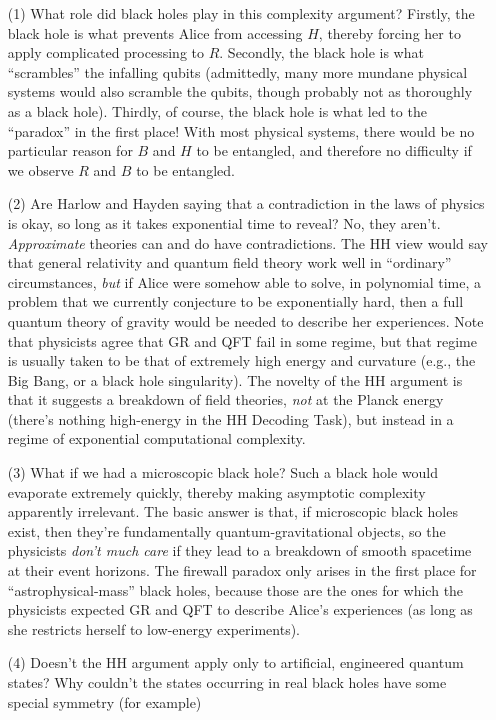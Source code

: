 \documentclass[11pt]{report}
\theoremstyle{plain}
\theoremstyle{definition}
\begin{document}
\begin{enumerate}
\item[(1)] What role did black holes play in this complexity argument?  Firstly, the black hole is what prevents Alice from accessing $H$, thereby forcing her to apply complicated processing to $R$.  Secondly, the black hole is what ``scrambles'' the infalling qubits (admittedly, many more mundane physical systems would also scramble the qubits, though probably not as thoroughly as a black hole).  Thirdly, of course, the black hole is what led to the ``paradox'' in the first place!  With most physical systems, there would be no particular reason for $B$ and $H$ to be entangled, and therefore no difficulty if we observe $R$ and $B$ to be entangled.
\item[(2)] Are Harlow and Hayden saying that a contradiction in the laws of physics is okay, so long as it takes exponential time to reveal?   No, they aren't.   {\em Approximate} theories can and do have contradictions.  The HH view would say that general relativity and quantum field theory work well in ``ordinary'' circumstances, {\em but} if Alice were somehow able to solve, in polynomial time, a problem that we currently conjecture to be exponentially hard, then a full quantum theory of gravity would be needed to describe her experiences.   Note that physicists agree that GR and QFT fail in some regime, but that regime is usually taken to be that of extremely high energy and curvature (e.g., the Big Bang, or a black hole singularity).  The novelty of the HH argument is that it suggests a breakdown of field theories, {\em not}
    at the Planck energy (there's nothing high-energy in the HH Decoding Task), but instead in a regime of exponential computational complexity.
\item[(3)] What if we had a microscopic black hole?  Such a black hole would evaporate extremely quickly, thereby making asymptotic complexity apparently irrelevant.  The basic answer is that, if microscopic black holes exist, then they're fundamentally quantum-gravitational objects, so the physicists {\em don't much care} if they lead to a breakdown of smooth spacetime at their event horizons.  The firewall paradox only arises in the first place for ``astrophysical-mass'' black holes, because those are the ones for which the physicists expected GR and QFT to describe Alice's experiences (as long as she restricts herself to low-energy experiments).
\item[(4)] Doesn't the HH argument apply only to artificial, engineered quantum states?  Why couldn't the states occurring in real black holes have some special symmetry (for example)

\end{enumerate}
\end{document}
